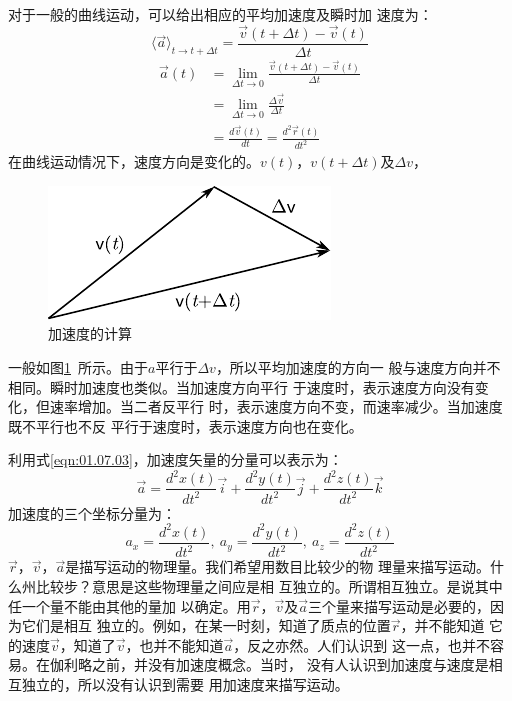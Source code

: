 对于一般的曲线运动，可以给出相应的平均加速度及瞬时加
速度为：
\begin{equation}\label{eqn:01.08.02}
    \langle \vec{a} \rangle_{t \rightarrow t+\Delta t} = \frac{\vec{v}(t+\Delta t)-\vec{v}(t)}{\Delta t}
\end{equation}
\begin{equation}\label{eqn:01.08.03}
    \begin{aligned}
        \vec{a}(t) & =\lim _{\Delta t \rightarrow 0} \frac{\vec{v}(t+\Delta t)-\vec{v}(t)}{\Delta t} \\
                  & =\lim_{\Delta t \rightarrow 0}\frac{\Delta \vec{v}}{\Delta t}                  \\
                  & =\frac{d\vec{v}(t)}{dt}=\frac{d^2 \vec{r}(t)}{d t^2}
    \end{aligned}
\end{equation}
在曲线运动情况下，速度方向是变化的。$v(t)$，$v(t+\Delta t)$及$\Delta v$，
\begin{figure}
    \centering
    \small
    \includegraphics{figure/fig01.14}
    \caption{加速度的计算}
    \label{fig:01.14}
\end{figure}
一般如图\ref{fig:01.14}~所示。由于$a$平行于$\Delta v$，所以平均加速度的方向一
般与速度方向并不相同。瞬时加速度也类似。当加速度方向平行
于速度时，表示速度方向没有变化，但速率增加。当二者反平行
时，表示速度方向不变，而速率减少。当加速度既不平行也不反
平行于速度时，表示速度方向也在变化。

利用式\eqref{eqn:01.07.03}，加速度矢量的分量可以表示为：
\begin{equation}\label{eqn:01.08.04}
    \vec{a}=\frac{d^2x(t)}{dt^2}\vec{i}+\frac{d^2y(t)}{dt^2}\vec{j}+\frac{d^2z(t)}{dt^2}\vec{k}
\end{equation}
加速度的三个坐标分量为：
\begin{equation}\label{eqn:01.08.05}
    a_x=\frac{d^2x(t)}{dt^2},~ a_y=\frac{d^2y(t)}{dt^2},~
    a_z=\frac{d^2z(t)}{dt^2}
\end{equation}
$\vec{r}$，$\vec{v}$，$\vec{a}$是描写运动的物理量。我们希望用数目比较少的物
理量来描写运动。什么州比较步？意思是这些物理量之间应是相
互独立的。所谓相互独立。是说其中任一个量不能由其他的量加
以确定。用$\vec{r}$，$\vec{v}$及$\vec{a}$三个量来描写运动是必要的，因为它们是相互
独立的。例如，在某一时刻，知道了质点的位置$\vec{r}$，并不能知道
它的速度$\vec{v}$，知道了$\vec{v}$，也并不能知道$\vec{a}$，反之亦然。人们认识到
这一点，也并不容易。在伽利略之前，并没有加速度概念。当时，
没有人认识到加速度与速度是相互独立的，所以没有认识到需要
用加速度来描写运动。

